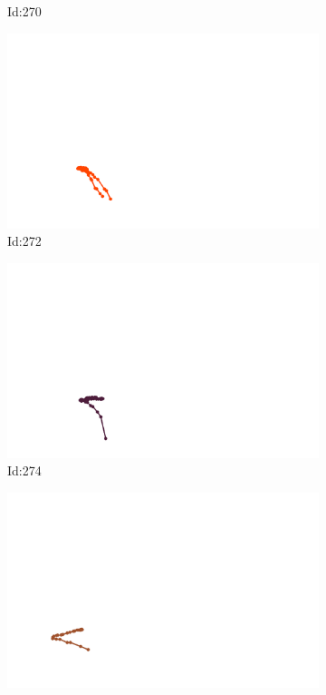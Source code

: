 \documentclass[12pt,twoside]{report}
\begin{document}
\begin{figure}
\begin{subfigure}[b]{0.20\textwidth}
\caption{Id:270}
\end{subfigure}
\begin{subfigure}[b]{0.20\textwidth}
\centering
\includegraphics[width=\textwidth]{../trajectories/272.png}
\caption{Id:272}
\end{subfigure}
\begin{subfigure}[b]{0.20\textwidth}
\centering
\includegraphics[width=\textwidth]{../trajectories/274.png}
\caption{Id:274}
\end{subfigure}
\begin{subfigure}[b]{0.20\textwidth}
\centering
\includegraphics[width=\textwidth]{../trajectories/275.png}

\end{subfigure}
\end{figure}
\end{document}
